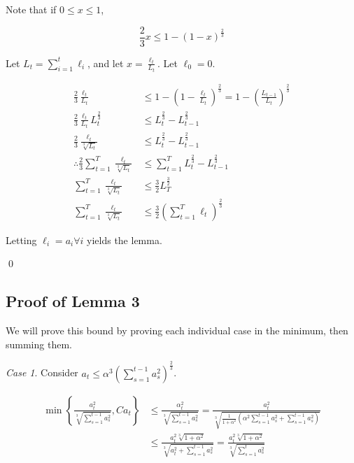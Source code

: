 \documentclass{article}
\begin{document}
\firstbound*

\proof Note that if $0 \leq x \leq 1$, 

\[
  \frac{2}{3} x \leq 1 - (1 - x)^\frac{2}{3}
\]

Let $L_t = \sum\limits_{i=1}^t \ell_i$, and let $x = \frac{\ell_t}{L_t}$. Let $\ell_0 = 0$.

\begin{align*}
  \frac{2}{3} \frac{\ell_t}{L_t}
  &\leq 1 - (1 - \frac{\ell_t}{L_t})^\frac{2}{3} = 1 - (\frac{L_{t-1}}{L_t})^\frac{2}{3} \\
  \frac{2}{3} \frac{\ell_t}{L_t} L_{t}^\frac{2}{3} &\leq L_{t}^\frac{2}{3} - L_{t-1}^\frac{2}{3} \\
  \frac{2}{3} \frac{\ell_t}{\sqrt[3]{L_t}} &\leq L_{t}^\frac{2}{3} - L_{t-1}^\frac{2}{3} \\
  \therefore \frac{2}{3} \sum\limits_{t=1}^T \frac{\ell_t}{\sqrt[3]{L_t}} &\leq \sum\limits_{t=1}^T L_{t}^\frac{2}{3} -
  L_{t-1}^\frac{2}{3} \\
  \sum\limits_{t=1}^T \frac{\ell_t}{\sqrt[3]{L_t}} &\leq \frac{3}{2} L_{T}^\frac{3}{2} \\
  \sum\limits_{t=1}^T \frac{\ell_t}{\sqrt[3]{L_t}} &\leq \frac{3}{2} \left(\sum\limits_{t=1}^T \ell_t \right)^\frac{2}{3}
\end{align*}

Letting $\ell_i = a_i \forall i$ yields the lemma.

\qed

\subsection{Proof of Lemma 3}\label{lemmaproof:3}

\secondbound*

\proof We will prove this bound by proving each individual case in the minimum, then summing them.

\emph{Case 1}. Consider $a_t \leq \alpha^3 \left(\sum\limits_{s=1}^{t-1} a_s^2\right)^\frac{2}{3}$.

\begin{align*}
  \min \left\{ \frac{a_{t}^2}{\sqrt[3]{\sum\limits_{s=1}^{t-1} a_{s}^2}}, C a_t \right\} 
  &\leq \frac{\alpha_{t}^2}{\sqrt[3]{\sum\limits_{s=1}^{t-1}a_{s}^2}} =
  \frac{a_{t}^2}{\sqrt[3]{\frac{1}{1+\alpha^2}\left(\alpha^2 \sum\limits_{s=1}^{t-1} a_{s}^2 +
  \sum\limits_{s=1}^{t-1} a_{s}^2 \right)}} \\
  &\leq \frac{a_{t}^2 \sqrt[3]{1 + \alpha^2}}{\sqrt[3]{a_{t}^2 + \sum\limits_{s=1}^{t-1} a_{s}^2}} = \frac{a_{t}^2
  \sqrt[3]{1 + \alpha^2}}{\sqrt[3]{\sum\limits_{s=1}^t a_{s}^2}}
\end{align*}
\end{document}
